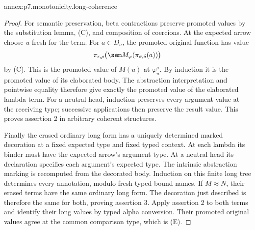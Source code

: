 \begin{annexitem}{annex:p7.monotonicity.long-coherence}
\begin{proof}
For semantic preservation, beta contractions preserve promoted values
by the substitution lemma, (C), and composition of coercions.
At the expected arrow choose \(u\) fresh for the term.
For \(a\in D_\sigma\), the promoted original function has value
\[
 \pi_{\epsilon,\rho}
       \bigl(\sem M_\varphi(\pi_{\sigma,\delta}(a))\bigr)
\]
by (C). This is the promoted value of \(M(u)\) at
\(\varphi_u^a\). By induction it is the promoted value of its elaborated
body. The abstraction interpretation and pointwise equality therefore
give exactly the promoted value of the elaborated lambda term.
For a neutral head, induction preserves every argument value at the
receiving type; successive applications then preserve the result value.
This proves assertion 2 in arbitrary coherent structures.

Finally the erased ordinary long form has a uniquely determined marked
decoration at a fixed expected type and fixed typed context.
At each lambda its binder must have the expected arrow's argument type.
At a neutral head its declaration specifies each argument's expected type.
The intrinsic abstraction marking is recomputed from the decorated body.
Induction on this finite long tree determines every annotation, modulo
fresh typed bound names. If \(M\approx N\), their erased terms have the
same ordinary long form. The decoration just described is therefore the
same for both, proving assertion 3.
Apply assertion 2 to both terms and identify their long values by typed
alpha conversion. Their promoted original values agree at the common
comparison type, which is (E).
\end{proof}
\end{annexitem}

